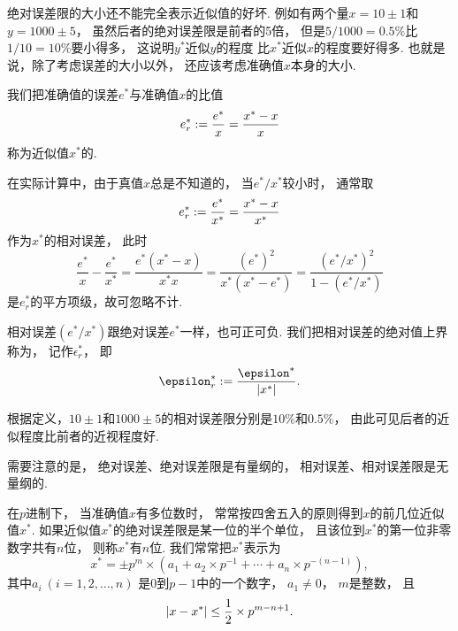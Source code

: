 绝对误差限的大小还不能完全表示近似值的好坏.
例如有两个量\(x = 10\pm1\)和\(y = 1000\pm5\)，
虽然后者的绝对误差限是前者的5倍，
但是\(5/1000 = 0.5\%\)比\(1/10 = 10\%\)要小得多，
这说明\(y^*\)近似\(y\)的程度
比\(x^*\)近似\(x\)的程度要好得多.
也就是说，除了考虑误差的大小以外，
还应该考虑准确值\(x\)本身的大小.

我们把准确值的误差\(e^*\)与准确值\(x\)的比值\begin{equation}
	e^*_r
	:= \frac{e^*}{x}
	= \frac{x^* - x}{x}
\end{equation}
称为近似值\(x^*\)的.

在实际计算中，由于真值\(x\)总是不知道的，
当\(e^* / x^*\)较小时，
通常取\begin{equation}
	e^*_r
	:= \frac{e^*}{x^*}
	= \frac{x^* - x}{x^*}
\end{equation}
作为\(x^*\)的相对误差，
此时\begin{equation*}
	\frac{e^*}{x}
	- \frac{e^*}{x^*}
	= \frac{e^* (x^* - x)}{x^* x}
	= \frac{(e^*)^2}{x^* (x^* - e^*)}
	= \frac{(e^* / x^*)^2}{1 - (e^* / x^*)}
\end{equation*}
是\(e^*_r\)的平方项级，故可忽略不计.

相对误差\((e^* / x^*)\)跟绝对误差\(e^*\)一样，也可正可负.
我们把相对误差的绝对值上界称为，
记作\(\epsilon^*_r\)，
即\begin{equation}
	\epsilon^*_r
	\defeq \frac{\epsilon^*}{\abs{x^*}}.
\end{equation}

根据定义，\(10\pm1\)和\(1000\pm5\)的相对误差限分别是\(10\%\)和\(0.5\%\)，
由此可见后者的近似程度比前者的近视程度好.

需要注意的是，
绝对误差、绝对误差限是有量纲的，
相对误差、相对误差限是无量纲的.

在\(p\)进制下，
当准确值\(x\)有多位数时，
常常按四舍五入的原则得到\(x\)的前几位近似值\(x^*\).
如果近似值\(x^*\)的绝对误差限是某一位的半个单位，
且该位到\(x^*\)的第一位非零数字共有\(n\)位，
则称\(x^*\)有\(n\)位.
我们常常把\(x^*\)表示为\begin{equation*}
	x^*
	= \pm p^m \times (
		a_1
		+ a_2 \times p^{-1}
		+ \dotsb
		+ a_n \times p^{-(n-1)}
	),
\end{equation*}
其中\(a_i\ (i=1,2,\dotsc,n)\)
是\(0\)到\(p-1\)中的一个数字，
\(a_1\neq0\)，
\(m\)是整数，
且\begin{equation*}
	\abs{x - x^*}
	\leq \frac12 \times p^{m-n+1}.
\end{equation*}

